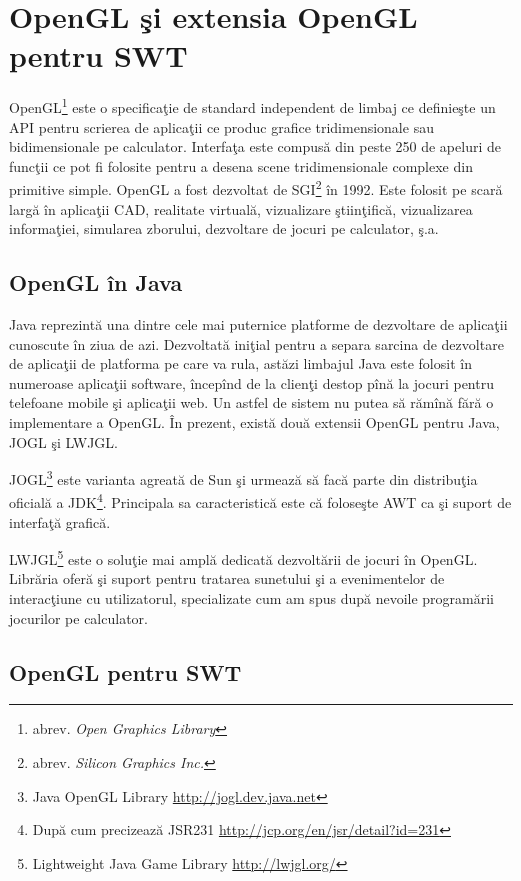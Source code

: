 \section{OpenGL şi extensia OpenGL pentru SWT}

OpenGL\footnote{abrev. \textit{Open Graphics Library}} este o specificaţie de 
standard independent de limbaj ce definieşte un API pentru scrierea de 
aplicaţii ce produc grafice tridimensionale sau bidimensionale pe calculator. 
Interfaţa este compusă din peste 250 de apeluri de funcţii ce pot fi folosite 
pentru a desena scene tridimensionale complexe din primitive simple. OpenGL a 
fost dezvoltat de SGI\footnote{abrev. \textit{Silicon Graphics Inc.}} în 1992. 
Este folosit pe scară largă în aplicaţii CAD, realitate virtuală, vizualizare 
ştiinţifică, vizualizarea informaţiei, simularea zborului, dezvoltare de jocuri 
pe calculator, ş.a. \cite{oglwiki}

\subsection{OpenGL în Java}
Java reprezintă una dintre cele mai puternice platforme de dezvoltare de 
aplicaţii cunoscute în ziua de azi. Dezvoltată iniţial pentru a separa sarcina 
de dezvoltare de aplicaţii de platforma pe care va rula, astăzi limbajul Java 
este folosit în numeroase aplicaţii software, începînd de la clienţi destop 
pînă la jocuri pentru telefoane mobile şi aplicaţii web. Un astfel de sistem nu 
putea să rămînă fără o implementare a OpenGL. În prezent, există două extensii 
OpenGL pentru Java, JOGL şi LWJGL.

JOGL\footnote{Java OpenGL Library \url{http://jogl.dev.java.net}} este varianta 
agreată de Sun şi urmează să facă parte din distribuţia oficială a 
JDK\footnote{După cum precizează JSR231 
\url{http://jcp.org/en/jsr/detail?id=231}}. Principala sa caracteristică este 
că foloseşte AWT ca şi suport de interfaţă grafică.

LWJGL\footnote{Lightweight Java Game Library \url{http://lwjgl.org/}} este o 
soluţie mai amplă dedicată dezvoltării de jocuri în OpenGL. Librăria oferă şi 
suport pentru tratarea sunetului şi a evenimentelor de interacţiune cu 
utilizatorul, specializate cum am spus după nevoile programării jocurilor pe 
calculator.

\subsection{OpenGL pentru SWT}

